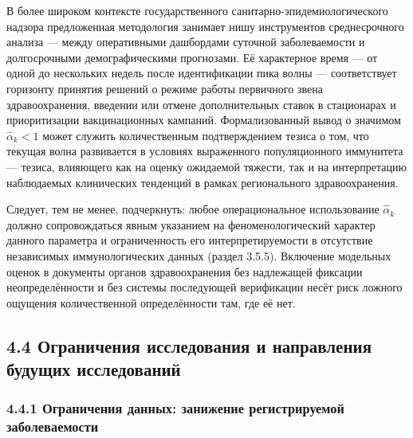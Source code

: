 \documentclass[12pt]{article}
\begin{document}
В более широком контексте государственного санитарно-эпидемиологического
надзора предложенная методология занимает нишу инструментов
среднесрочного анализа --- между оперативными дашбордами суточной
заболеваемости и долгосрочными демографическими прогнозами. Её
характерное время --- от одной до нескольких недель после идентификации
пика волны --- соответствует горизонту принятия решений о режиме работы
первичного звена здравоохранения, введении или отмене дополнительных
ставок в стационарах и приоритизации вакцинационных кампаний.
Формализованный вывод о значимом \(\hat{\alpha}_k < 1\) может служить
количественным подтверждением тезиса о том, что текущая волна
развивается в условиях выраженного популяционного иммунитета --- тезиса,
влияющего как на оценку ожидаемой тяжести, так и на интерпретацию
наблюдаемых клинических тенденций в рамках регионального
здравоохранения.

Следует, тем не менее, подчеркнуть: любое операциональное использование
\(\hat{\alpha}_k\) должно сопровождаться явным указанием на
феноменологический характер данного параметра и ограниченность его
интерпретируемости в отсутствие независимых иммунологических данных
(раздел 3.5.5). Включение модельных оценок в документы органов
здравоохранения без надлежащей фиксации неопределённости и без системы
последующей верификации несёт риск ложного ощущения количественной
определённости там, где её нет.

\subsection{4.4 Ограничения исследования и направления будущих
исследований}\label{ux43eux433ux440ux430ux43dux438ux447ux435ux43dux438ux44f-ux438ux441ux441ux43bux435ux434ux43eux432ux430ux43dux438ux44f-ux438-ux43dux430ux43fux440ux430ux432ux43bux435ux43dux438ux44f-ux431ux443ux434ux443ux449ux438ux445-ux438ux441ux441ux43bux435ux434ux43eux432ux430ux43dux438ux439}

\subsubsection{4.4.1 Ограничения данных: занижение регистрируемой
заболеваемости}\label{ux43eux433ux440ux430ux43dux438ux447ux435ux43dux438ux44f-ux434ux430ux43dux43dux44bux445-ux437ux430ux43dux438ux436ux435ux43dux438ux435-ux440ux435ux433ux438ux441ux442ux440ux438ux440ux443ux435ux43cux43eux439-ux437ux430ux431ux43eux43bux435ux432ux430ux435ux43cux43eux441ux442ux438}
\end{document}
